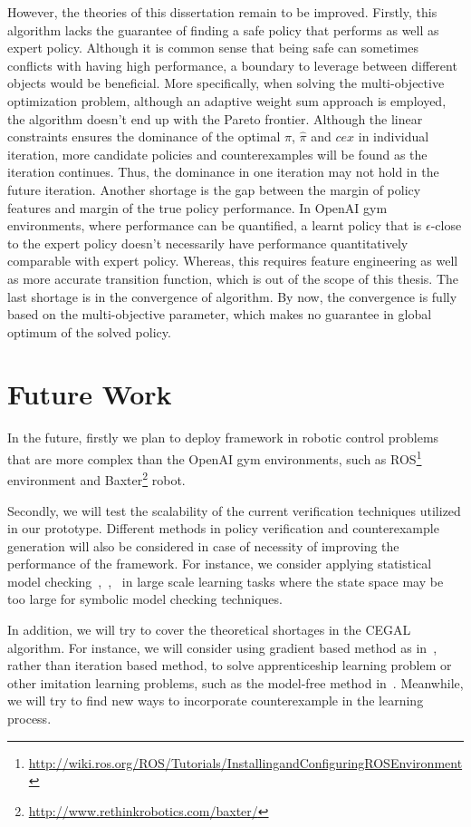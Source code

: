 However, the theories of this dissertation remain to be improved. Firstly, this algorithm lacks the guarantee of finding a safe policy that performs as well as expert policy. Although it is common sense that being safe can sometimes conflicts with having high performance, a boundary to leverage between different objects would be beneficial. More specifically, when solving the multi-objective optimization problem, although an adaptive weight sum approach is employed, the algorithm doesn't end up with the Pareto frontier. Although the linear constraints ensures the dominance of the optimal $\pi$, $\hat{\pi}$ and $cex$ in individual iteration, more candidate policies and counterexamples will be found as the iteration continues. Thus, the dominance in one iteration may not hold in the future iteration. Another shortage is the gap between the margin of policy features and margin of the true policy performance. In OpenAI gym environments, where performance can be quantified, a learnt policy that is {$\epsilon$-close} to the expert policy doesn't necessarily have performance quantitatively comparable with expert policy. Whereas, this requires feature engineering as well as more accurate transition function, which is out of the scope of this thesis. The last shortage is in the convergence of algorithm. By now, the convergence is fully based on the multi-objective parameter, which makes no guarantee in global optimum of the solved policy.

\section{Future Work}
In the future, firstly we plan to deploy framework in robotic control problems that are more complex than the OpenAI gym environments, such as ROS\footnote{\url{http://wiki.ros.org/ROS/Tutorials/InstallingandConfiguringROSEnvironment}} environment and Baxter\footnote{\url{http://www.rethinkrobotics.com/baxter/}} robot. 

Secondly, we will test the scalability of the current verification techniques utilized in our prototype. Different methods in policy verification and counterexample generation will also be considered in case of necessity of improving the performance of the framework. For instance, we consider applying statistical model checking~\cite{10.1007/978-3-642-19829-8_10},~\cite{Younes:2006:SPM:1182767.1182770},~\cite{henriques2012statistical} in large scale learning tasks where the state space may be too large for symbolic model checking techniques.

In addition, we will try to cover the theoretical shortages in the CEGAL algorithm. For instance, we will consider using gradient based method as in~\cite{neu2012apprenticeship}, rather than iteration based method, to solve apprenticeship learning problem or other imitation learning problems, such as the model-free method in~\cite{ho2016model}. Meanwhile, we will try to find new ways to incorporate counterexample in the learning process.